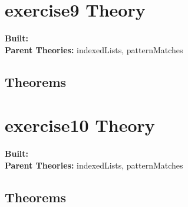 \documentclass[11pt, twoside]{article}
\begin{document}



\tableofcontents
\cleardoublepage
\HOLpagestyle

\section{exercise9 Theory}
\begin{flushleft}
\textbf{Built:} \HOLexerciseNineDate \\[2pt]
\textbf{Parent Theories:} indexedLists, patternMatches
\end{flushleft}



\subsection{Theorems}

\HOLexerciseNineTheorems

\section{exercise10 Theory}
\begin{flushleft}
\textbf{Built:} \HOLexerciseOneZeroDate \\[2pt]
\textbf{Parent Theories:} indexedLists, patternMatches
\end{flushleft}



\subsection{Theorems}

\HOLexerciseOneZeroTheorems

\HOLindex
\end{document}
